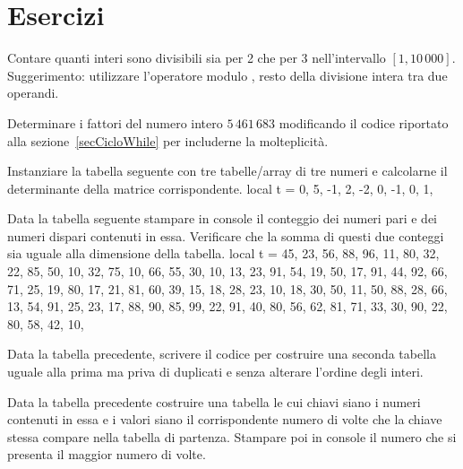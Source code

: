 \section{Esercizi}

\begin{Exercise}[label=cos-01]
Contare quanti interi sono divisibili sia per 2 che per 3 nell'intervallo \( [1,
10\,000]\). Suggerimento: utilizzare l'operatore modulo \key{\%}, resto della
divisione intera tra due operandi.
\end{Exercise}

\begin{Exercise}[label=cos-02]
Determinare i fattori del numero intero \(5\,461\,683\) modificando il codice
riportato alla sezione~\ref{secCicloWhile} per includerne la molteplicità.
\end{Exercise}

\begin{Exercise}[label=cos-03]
Instanziare la tabella seguente con tre tabelle/array di tre numeri e calcolarne
il determinante della matrice corrispondente.
\lines
local t = {
    { 0,  5, -1},
    { 2, -2,  0},
    {-1,  0,  1},
}
\endlines
{}
\end{Exercise}

\begin{Exercise}[label=cos-04]
Data la tabella seguente stampare in console il conteggio dei numeri pari e dei
numeri dispari contenuti in essa. Verificare che la somma di questi due
conteggi sia uguale alla dimensione della tabella.
\lines
local t = {
    45, 23, 56, 88, 96, 11,
    80, 32, 22, 85, 50, 10,
    32, 75, 10, 66, 55, 30,
    10, 13, 23, 91, 54, 19,
    50, 17, 91, 44, 92, 66,
    71, 25, 19, 80, 17, 21,
    81, 60, 39, 15, 18, 28,
    23, 10, 18, 30, 50, 11,
    50, 88, 28, 66, 13, 54,
    91, 25, 23, 17, 88, 90,
    85, 99, 22, 91, 40, 80,
    56, 62, 81, 71, 33, 30,
    90, 22, 80, 58, 42, 10,
}
\endlines
{}
\end{Exercise}

\begin{Exercise}[label=cos-05]
Data la tabella precedente, scrivere il codice per costruire una seconda tabella
uguale alla prima ma priva di duplicati e senza alterare l'ordine degli interi.
\end{Exercise}

\begin{Exercise}[label=cos-06]
Data la tabella precedente costruire una tabella le cui chiavi siano i numeri
contenuti in essa e i valori siano il corrispondente numero di volte che la
chiave stessa compare nella tabella di partenza. Stampare poi in console il
numero che si presenta il maggior numero di volte.
\end{Exercise}

